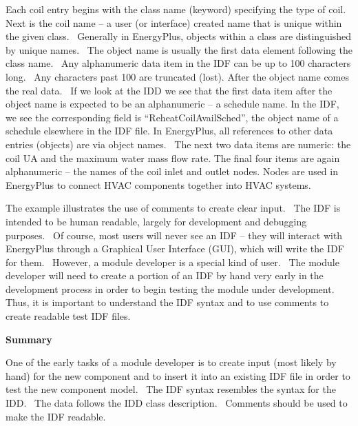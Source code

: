 Each coil entry begins with the class name (keyword) specifying the type of coil.~ Next is the coil name -- a user (or interface) created name that is unique within the given class.~ Generally in EnergyPlus, objects within a class are distinguished by unique names.~ The object name is usually the first data element following the class name.~ Any alphanumeric data item in the IDF can be up to 100 characters long.~ Any characters past 100 are truncated (lost). After the object name comes the real data.~ If we look at the IDD we see that the first data item after the object name is expected to be an alphanumeric -- a schedule name. In the IDF, we see the corresponding field is ``ReheatCoilAvailSched'', the object name of a schedule elsewhere in the IDF file. In EnergyPlus, all references to other data entries (objects) are via object names.~ The next two data items are numeric: the coil UA and the maximum water mass flow rate. The final four items are again alphanumeric -- the names of the coil inlet and outlet nodes. Nodes are used in EnergyPlus to connect HVAC components together into HVAC systems.

The example illustrates the use of comments to create clear input.~ The IDF is intended to be human readable, largely for development and debugging purposes.~ Of course, most users will never see an IDF -- they will interact with EnergyPlus through a Graphical User Interface (GUI), which will write the IDF for them.~ However, a module developer is a special kind of user.~ The module developer will need to create a portion of an IDF by hand very early in the development process in order to begin testing the module under development.~ Thus, it is important to understand the IDF syntax and to use comments to create readable test IDF files.

\textbf{Summary}

One of the early tasks of a module developer is to create input (most likely by hand) for the new component and to insert it into an existing IDF file in order to test the new component model.~ The IDF syntax resembles the syntax for the IDD.~ The data follows the IDD class description.~ Comments should be used to make the IDF readable.
